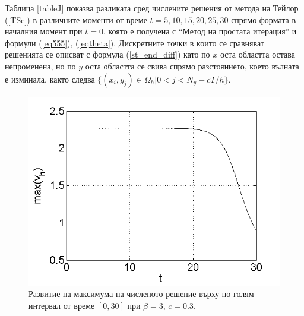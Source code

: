 \documentclass[a4paper]{article}
\newcommand{\rf}[1]{(\ref{#1})}
\theoremstyle{remark}
\begin{document}
Таблица \ref{tableJ} показва разликата сред числените решения от метода на Тейлор \rf{TSe} в различните моменти от време $t=5,10,15,20,25,30$ спрямо формата в началния момент при $t=0$, която е получена с ``Метод на простата итерация'' и формули \rf{eq555}, \rf{eqtheta}. Дискретните точки в които се сравняват решенията се описват с формула \rf{st_end_diff} като по $x$ оста областта остава непроменена, но по $y$ оста областта се свива спрямо разстоянието, което вълната е изминала, както следва $\{(x_i, y_j) \in \Omega_h |0 < j < N_y - cT/h\}$.

\begin{figure}\vspace{0.2cm}
	\includegraphics[width=\linewidth]{SolutionView/maximum_50_bt3_c030_h005.png}
\caption{Развитие на максимума на численото решение върху по-голям интервал от време $[0, 30]$ при $\beta = 3$, $c=0.3$.}
\label{Maximum2}
\end{figure}
\FloatBarrier
\end{document}
